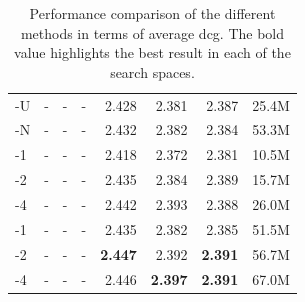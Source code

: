 \begin{table}
\begin{tabularx}{\linewidth}{lRRRRRRR}
  \midrule
  \sparsettv{}-U       & -              & -              & -              & 2.428         & 2.381          & 2.387          & 25.4M     \\
  \sparsettv{}-N       & -              & -              & -              & 2.432         & 2.382          & 2.384          & 53.3M     \\
  \midrule
  \densettv{}-1        & -              & -              & -              & 2.418         & 2.372          & 2.381          & 10.5M     \\
  \densettv{}-2        & -              & -              & -              & 2.435         & 2.384          & 2.389          & 15.7M     \\
  \densettv{}-4        & -              & -              & -              & 2.442         & 2.393          & 2.388          & 26.0M     \\
  \midrule
  \widedeepttv{}-1     & -              & -              & -              & 2.435         & 2.382          & 2.385          & 51.5M     \\
  \widedeepttv{}-2     & -              & -              & -              & \textbf{2.447}& 2.392          & \textbf{2.391} & 56.7M     \\
  \widedeepttv{}-4     & -              & -              & -              & 2.446         & \textbf{2.397} & \textbf{2.391} & 67.0M     \\
  \bottomrule
\end{tabularx}
\caption{Performance comparison of the different methods in terms of average \gls{dcg}.
The bold value highlights the best result in each of the search spaces.}
\label{tab:t2v:dcg}
\end{table}


